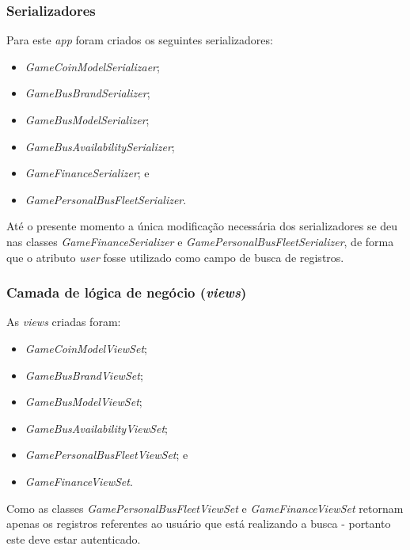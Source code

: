 \subsubsection{Serializadores}
Para este \textit{app} foram criados os seguintes serializadores:%
\begin{itemize}
    \item \textit{GameCoinModelSerializaer};
    \item \textit{GameBusBrandSerializer};
    \item \textit{GameBusModelSerializer};
    \item \textit{GameBusAvailabilitySerializer};
    \item \textit{GameFinanceSerializer}; e
    \item \textit{GamePersonalBusFleetSerializer}.
\end{itemize}

Até o presente momento a única modificação necessária dos serializadores se deu nas classes \textit{GameFinanceSerializer} e \textit{GamePersonalBusFleetSerializer}, de forma que o atributo \textit{user} fosse utilizado como campo de busca de registros.

\subsubsection{Camada de lógica de negócio (\textit{views})}
As \textit{views} criadas foram: %
\begin{itemize}
    \item \textit{GameCoinModelViewSet};
    \item \textit{GameBusBrandViewSet};
    \item \textit{GameBusModelViewSet};
    \item \textit{GameBusAvailabilityViewSet};
    \item \textit{GamePersonalBusFleetViewSet}; e
    \item \textit{GameFinanceViewSet}.
\end{itemize}

Como as classes \textit{GamePersonalBusFleetViewSet} e \textit{GameFinanceViewSet} retornam apenas os registros referentes ao usuário que está realizando a busca - portanto este deve estar autenticado.

